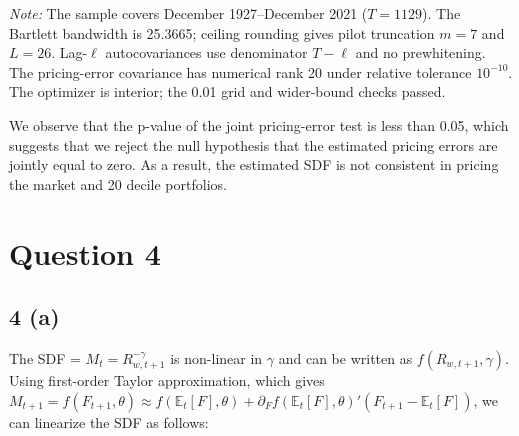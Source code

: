 \documentclass[11pt]{article}
\begin{document}
\begin{table}[htbp]
\begin{minipage}{0.98\textwidth}
    \par\smallskip
    {\footnotesize\raggedright \textit{Note:} The sample covers December 1927--December 2021 ($T=1129$). The Bartlett bandwidth is 25.3665; ceiling rounding gives pilot truncation $m=7$ and $L=26$. Lag-$\ell$ autocovariances use denominator $T-\ell$ and no prewhitening. The pricing-error covariance has numerical rank 20 under relative tolerance $10^{-10}$. The optimizer is interior; the 0.01 grid and wider-bound checks passed.\par}
  \end{minipage}
\end{table}

We observe that the p-value of the joint pricing-error test is less than 0.05, 
which suggests that we reject the null hypothesis that the estimated pricing errors 
are jointly equal to zero. As a result, the estimated SDF is not consistent in pricing the market and 20 decile portfolios.

\section*{Question 4}
\subsection*{4 (a)}
The SDF = $M_t = R_{w,t+1}^{-\gamma}$ is non-linear in $\gamma$ and can be written as $f(R_{w,t+1}, \gamma)$. 
Using first-order Taylor approximation, which gives $M_{t+1} = f(F_{t+1}, \theta) \approx f(\mathbb{E}_{t}[F], \theta) + \partial_{F} f(\mathbb{E}_{t}[F], \theta)' (F_{t+1} - \mathbb{E}_{t}[F])$,
we can linearize the SDF as follows:
\end{document}
